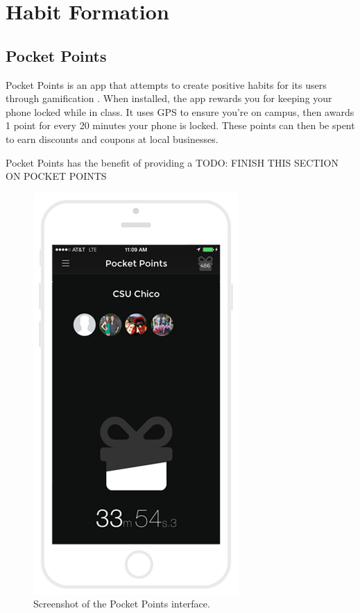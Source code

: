 

\section{Habit Formation}

\subsection{Pocket Points}
\par Pocket Points is an app that attempts to create positive habits for its users through gamification \cite{pocketpoints}. When installed, the app rewards you for keeping your phone locked while in class. It uses GPS to ensure you're on campus, then awards 1 point for every 20 minutes your phone is locked. These points can then be spent to earn discounts and coupons at local businesses.

\par Pocket Points has the benefit of providing a 
TODO: FINISH THIS SECTION ON POCKET POINTS


\begin{figure}
	\centering
	\includegraphics[width=0.7\linewidth]{figures/pocket-points}
	\caption[Memrise]{Screenshot of the Pocket Points interface. }
	\label{fig:pocket-points}
\end{figure}


